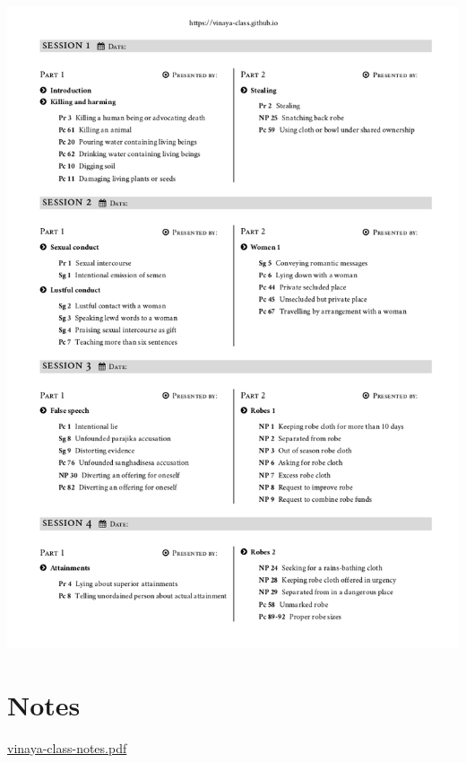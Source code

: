 \href{./includes/docs/schedule.pdf}{\includegraphics{./includes/docs/schedule-thumb.png}}

\section{Notes}

\href{./includes/docs/vinaya-class-notes.pdf}{vinaya-class-notes.pdf}

